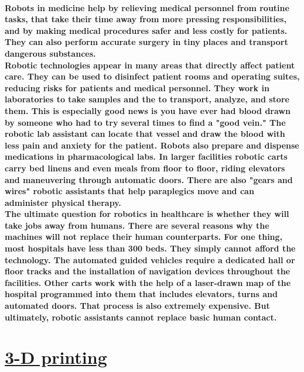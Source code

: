 \documentclass[12pt]{article}
\begin{document}
    \paragraph{Robots in medicine help by relieving medical personnel from routine tasks, that take their time away from more pressing responsibilities, and by making medical procedures safer and less costly for patients. They can also perform accurate surgery in tiny places and transport dangerous substances.
    \\Robotic technologies appear in many areas that directly affect patient care. They can be used to disinfect patient rooms and operating suites, reducing risks for patients and medical personnel. They work in laboratories to take samples and the to transport, analyze, and store them. This is especially good news is you have ever had blood drawn by someone who had to try several times to find a "good vein." The robotic lab assistant can locate that vessel and draw the blood with less pain and anxiety for the patient. Robots also prepare and dispense medications in pharmacological labs. In larger facilities robotic carts carry bed linens and even meals from floor to floor, riding elevators and maneuvering through automatic doors. There are also "gears and wires" robotic assistants that help paraplegics move and can administer physical therapy.
    \\The ultimate question for robotics in healthcare is whether they will take jobs away from humans. There are several reasons why the machines will not replace their human counterparts. For one thing, most hospitals have less than 300 beds. They simply cannot afford the technology. The automated guided vehicles require a dedicated hall or floor tracks and the installation of navigation devices throughout the facilities. Other carts work with the help of a laser-drawn map of the hospital programmed into them that includes elevators, turns and automated doors. That process is also extremely expensive. But ultimately, robotic assistants cannot replace basic human contact. }
    \section{\underline{3-D printing}}
\end{document}
